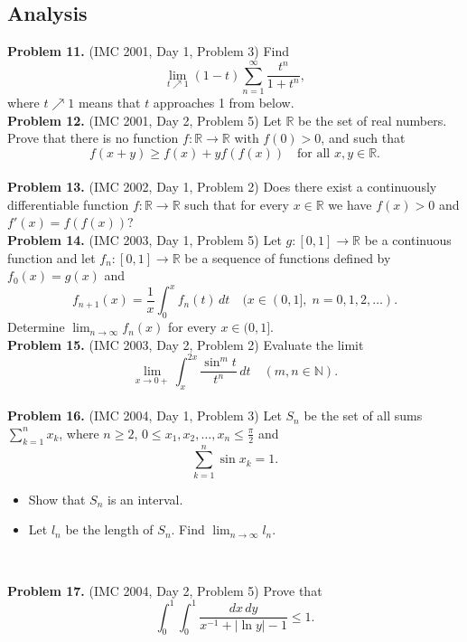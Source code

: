 \documentclass{article}
\begin{document}
\subsection*{Analysis}

\textbf{Problem 11.} (IMC 2001, Day 1, Problem 3)
Find
\[
\lim_{t \nearrow 1} (1 - t) \sum_{n=1}^{\infty} \frac{t^n}{1 + t^n},
\]
where \( t \nearrow 1 \) means that \( t \) approaches 1 from below.
\\

\textbf{Problem 12.} (IMC 2001, Day 2, Problem 5)
Let \( \mathbb{R} \) be the set of real numbers. Prove that there is no function \( f : \mathbb{R} \to \mathbb{R} \) with \( f(0) > 0 \), and such that
\[
f(x + y) \geq f(x) + y f(f(x)) \quad \text{for all } x, y \in \mathbb{R}.
\]
\\

\textbf{Problem 13.} (IMC 2002, Day 1, Problem 2)
Does there exist a continuously differentiable function \( f : \mathbb{R} \to \mathbb{R} \) such that for every \( x \in \mathbb{R} \) we have \( f(x) > 0 \) and \( f'(x) = f(f(x)) \)?
\\

\textbf{Problem 14.} (IMC 2003, Day 1, Problem 5)
Let \( g : [0, 1] \to \mathbb{R} \) be a continuous function and let \( f_n : [0, 1] \to \mathbb{R} \) be a sequence of functions defined by \( f_0(x) = g(x) \) and
\[
f_{n+1}(x) = \frac{1}{x} \int_0^x f_n(t)\, dt \quad (x \in (0, 1], \; n = 0, 1, 2, \ldots).
\]
Determine \( \lim_{n \to \infty} f_n(x) \) for every \( x \in (0, 1] \).
\\

\textbf{Problem 15.} (IMC 2003, Day 2, Problem 2)
Evaluate the limit
\[
\lim_{x \to 0+} \int_x^{2x} \frac{\sin^m t}{t^n}\, dt \quad (m, n \in \mathbb{N}).
\]
\\

\textbf{Problem 16.} (IMC 2004, Day 1, Problem 3)
Let \( S_n \) be the set of all sums \( \displaystyle\sum_{k=1}^{n} x_k \), where \( n \geq 2 \), \( 0 \leq x_1, x_2, \ldots, x_n \leq \frac{\pi}{2} \) and
\[
\sum_{k=1}^{n} \sin x_k = 1.
\]
\begin{itemize}
    \item[a)] Show that \( S_n \) is an interval.
    \item[b)] Let \( l_n \) be the length of \( S_n \). Find \( \displaystyle\lim_{n \to \infty} l_n \).
\end{itemize}
\

\textbf{Problem 17.} (IMC 2004, Day 2, Problem 5)
Prove that
\[
\int_0^1 \int_0^1 \frac{dx\, dy}{x^{-1} + |\ln y| - 1} \leq 1.
\]
\\
\end{document}

